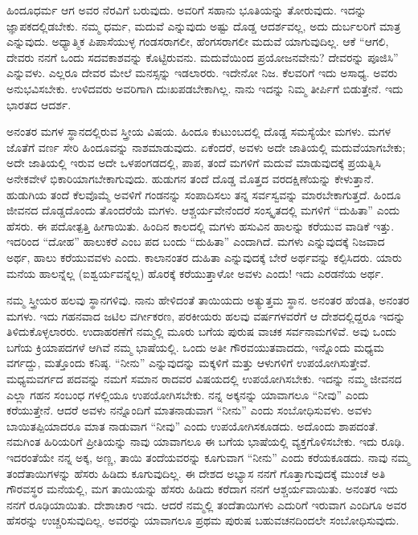 ಹಿಂದೂಧರ್ಮ ಆಗ ಅವರ ನೆರವಿಗೆ ಬರುವುದು. ಅವರಿಗೆ ಸಹಾನು ಭೂತಿಯನ್ನು ತೋರುವುದು. ಇದನ್ನು ಜ್ಞಾಪಕದಲ್ಲಿಡಬೇಕು. ನಮ್ಮ ಧರ್ಮ, ಮದುವೆ ಎನ್ನುವುದು ಅಷ್ಟು ದೊಡ್ಡ ಆದರ್ಶವಲ್ಲ, ಅದು ದುರ್ಬಲರಿಗೆ ಮಾತ್ರ ಎನ್ನುವುದು. ಅಧ್ಯಾತ್ಮಿಕ ಪಿಪಾಸೆಯುಳ್ಳ ಗಂಡಸರಾಗಲೀ, ಹೆಂಗಸರಾಗಲೀ ಮದುವೆ ಯಾಗುವುದಿಲ್ಲ. ಆಕೆ “ಆಗಲಿ, ದೇವರು ನನಗೆ ಒಂದು ಸದವಕಾಶವನ್ನು ಕೊಟ್ಟಿರುವನು. ಮದುವೆಯಿಂದ ಪ್ರಯೋಜನವೇನು? ದೇವರನ್ನು ಪೂಜಿಸಿ” ಎನ್ನುವಳು. ಎಲ್ಲರೂ ದೇವರ ಮೇಲೆ ಮನಸ್ಸನ್ನು ಇಡಲಾರರು. ಇದೇನೋ ನಿಜ. ಕೆಲವರಿಗೆ ಇದು ಅಸಾಧ್ಯ. ಅವರು ಅನುಭವಿಸಬೇಕು. ಉಳಿದವರು ಅವರಿಗಾಗಿ ದುಃಖಪಡಬೇಕಾಗಿಲ್ಲ. ನಾನು ಇದನ್ನು ನಿಮ್ಮ ತೀರ್ಪಿಗೆ ಬಿಡುತ್ತೇನೆ. ಇದು ಭಾರತದ ಆದರ್ಶ.

ಅನಂತರ ಮಗಳ ಸ್ಥಾನದಲ್ಲಿರುವ ಸ್ತ್ರೀಯ ವಿಷಯ. ಹಿಂದೂ ಕುಟುಂಬದಲ್ಲಿ ದೊಡ್ಡ ಸಮಸ್ಯೆಯೇ ಮಗಳು. ಮಗಳ ಜೊತೆಗೆ ವರ್ಣ ಸೇರಿ ಹಿಂದೂವನ್ನು ನಾಶಮಾಡುವುದು. ಏಕೆಂದರೆ, ಅವಳು ಅದೇ ಜಾತಿಯಲ್ಲಿ ಮದುವೆಯಾಗಬೇಕು; ಅದೇ ಜಾತಿಯಲ್ಲಿ ಇರುವ ಅದೇ ಒಳಪಂಗಡದಲ್ಲಿ, ಪಾಪ, ತಂದೆ ಮಗಳಿಗೆ ಮದುವೆ ಮಾಡುವುದಕ್ಕೆ ಪ್ರಯತ್ನಿಸಿ ಅನೇಕವೇಳೆ ಭಿಕಾರಿಯಾಗಬೇಕಾಗುವುದು. ಹುಡುಗನ ತಂದೆ ದೊಡ್ಡ ಮೊತ್ತದ ವರದಕ್ಷಿಣೆಯನ್ನು ಕೇಳುತ್ತಾನೆ. ಹುಡುಗಿಯ ತಂದೆ ಕೆಲವೊಮ್ಮೆ ಅವಳಿಗೆ ಗಂಡನನ್ನು ಸಂಪಾದಿಸಲು ತನ್ನ ಸರ್ವಸ್ವವನ್ನು ಮಾರಬೇಕಾಗುತ್ತದೆ. ಹಿಂದೂ ಜೀವನದ ದೊಡ್ಡದೊಂದು ತೊಂದರೆಯೆ ಮಗಳು. ಆಶ್ಚರ್ಯವೇನೆಂದರೆ ಸಂಸ್ಕೃತದಲ್ಲಿ ಮಗಳಿಗೆ “ದುಹಿತಾ” ಎಂದು ಹೆಸರು. ಈ ಪದೋತ್ಪತ್ತಿ ಹೀಗಾಯಿತು. ಹಿಂದಿನ ಕಾಲದಲ್ಲಿ ಮಗಳು ಹಸುವಿನ ಹಾಲನ್ನು ಕರೆಯುವ ವಾಡಿಕೆ ಇತ್ತು. ಇದರಿಂದ “ದೋಹ” ಹಾಲುಕರೆ ಎಂಬ ಪದ ಬಂದು “ದುಹಿತಾ” ಎಂದಾಗಿದೆ. ಮಗಳು ಎನ್ನುವುದಕ್ಕೆ ನಿಜವಾದ ಅರ್ಥ, ಹಾಲು ಕರೆಯುವವಳು ಎಂದು. ಕಾಲಾನಂತರ ದುಹಿತಾ ಎನ್ನುವುದಕ್ಕೆ ಬೇರೆ ಅರ್ಥವನ್ನು ಕಲ್ಪಿಸಿದರು. ಯಾರು ಮನೆಯ ಹಾಲನ್ನೆಲ್ಲ (ಐಶ್ವರ್ಯವನ್ನೆಲ್ಲ) ಹೊರಕ್ಕೆ ಕರೆಯುತ್ತಾಳೋ ಅವಳು ಎಂದು! ಇದು ಎರಡನೆಯ ಅರ್ಥ.

ನಮ್ಮ ಸ್ತ್ರೀಯರ ಹಲವು ಸ್ಥಾನಗಳಿವು. ನಾನು ಹೇಳಿದಂತೆ ತಾಯಿಯದು ಅತ್ಯುತ್ತಮ ಸ್ಥಾನ. ಅನಂತರ ಹೆಂಡತಿ, ಅನಂತರ ಮಗಳು. ಇದು ಗಹನವಾದ ಜಟಿಲ ವರ್ಗೀಕರಣ, ಪರಕೀಯರು ಹಲವು ವರ್ಷಗಳವರೆಗೆ ಆ ದೇಶದಲ್ಲಿದ್ದರೂ ಇದನ್ನು ತಿಳಿದುಕೊಳ್ಳಲಾರರು. ಉದಾಹರಣೆಗೆ ನಮ್ಮಲ್ಲಿ ಮೂರು ಬಗೆಯ ಪುರುಷ ವಾಚಕ ಸರ್ವನಾಮಗಳಿವೆ. ಅವು ಒಂದು ಬಗೆಯ ಕ್ರಿಯಾಪದಗಳೆ ಆಗಿವೆ ನಮ್ಮ ಭಾಷೆಯಲ್ಲಿ. ಒಂದು ಅತೀ ಗೌರವಯುತವಾದದು, ಇನ್ನೊಂದು ಮಧ್ಯಮ ವರ್ಗದ್ದು, ಮತ್ತೊಂದು ಕನಿಷ್ಠ. “ನೀನು” ಎನ್ನುವುದನ್ನು ಮಕ್ಕಳಿಗೆ ಮತ್ತು ಆಳುಗಳಿಗೆ ಉಪಯೋಗಿಸುತ್ತೇವೆ. ಮಧ್ಯಮವರ್ಗದ ಪದವನ್ನು ನಮಗೆ ಸಮಾನ ರಾದವರ ವಿಷಯದಲ್ಲಿ ಉಪಯೋಗಿಸಬೇಕು. ಇದನ್ನು ನಮ್ಮ ಜೀವನದ ಎಲ್ಲಾ ಗಹನ ಸಂಬಂಧ ಗಳಲ್ಲಿಯೂ ಉಪಯೋಗಿಸಬೇಕು. ನನ್ನ ಅಕ್ಕನನ್ನು ಯಾವಾಗಲೂ “ನೀವು” ಎಂದು ಕರೆಯುತ್ತೇನೆ. ಆದರೆ ಅವಳು ನನ್ನೊಂದಿಗೆ ಮಾತನಾಡುವಾಗ “ನೀನು” ಎಂದು ಸಂಬೋಧಿಸುವಳು. ಅವಳು ಬಾಯಿತಪ್ಪಿಯಾದರೂ ಮಾತ ನಾಡುವಾಗ “ನೀವು” ಎಂದು ಉಪಯೋಗಿಸಕೂಡದು. ಅದೊಂದು ಶಾಪದಂತೆ. ನಮಗಿಂತ ಹಿರಿಯರಿಗೆ ಪ್ರೀತಿಯನ್ನು ನಾವು ಯಾವಾಗಲೂ ಈ ಬಗೆಯ ಭಾಷೆಯಲ್ಲಿ ವ್ಯಕ್ತಗೊಳಿಸಬೇಕು. ಇದು ರೂಢಿ. ಇದರಂತೆಯೇ ನನ್ನ ಅಕ್ಕ, ಅಣ್ಣ, ತಾಯಿ ತಂದೆಯವರನ್ನು ಕೂಗುವಾಗ “ನೀನು” ಎಂದು ಕರೆಯಕೂಡದು. ನಾವು ನಮ್ಮ ತಂದೆತಾಯಿಗಳನ್ನು ಹೆಸರು ಹಿಡಿದು ಕೂಗುವುದಿಲ್ಲ. ಈ ದೇಶದ ಅಭ್ಯಾಸ ನನಗೆ ಗೊತ್ತಾಗುವುದಕ್ಕೆ ಮುಂಚೆ ಅತಿ ಗೌರವಸ್ಥರ ಮನೆಯಲ್ಲಿ, ಮಗ ತಾಯಿಯನ್ನು ಹೆಸರು ಹಿಡಿದು ಕರೆದಾಗ ನನಗೆ ಆಶ್ಚರ್ಯವಾಯಿತು. ಅನಂತರ ಇದು ನನಗೆ ರೂಢಿಯಾಯಿತು. ದೇಶಾಚಾರ ಇದು. ಆದರೆ ನಮ್ಮಲ್ಲಿ ತಂದೆತಾಯಿಗಳು ಎದುರಿಗೆ ಇರುವಾಗ ಎಂದಿಗೂ ಅವರ ಹೆಸರನ್ನು ಉಚ್ಚರಿಸುವುದಿಲ್ಲ. ಅವರನ್ನು ಯಾವಾಗಲೂ ಪ್ರಥಮ ಪುರುಷ ಬಹುವಚನದಿಂದಲೇ ಸಂಬೋಧಿಸುವುದು.

